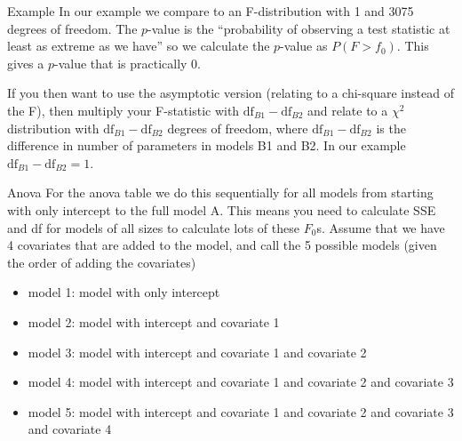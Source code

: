 \documentclass[
  ignorenonframetext,
]{beamer}
\providecommand{\tightlist}{%
  \setlength{\itemsep}{0pt}\setlength{\parskip}{0pt}}
\begin{document}
\begin{frame}{Example}
\label{example}
In our example we compare to an F-distribution with 1 and 3075 degrees
of freedom. The \(p\)-value is the ``probability of observing a test
statistic at least as extreme as we have'' so we calculate the
\(p\)-value as \(P(F>f_0)\). This gives a \(p\)-value that is
practically 0.

If you then want to use the asymptotic version (relating to a chi-square
instead of the F), then multiply your F-statistic with
\(\text{df}_{B1}-\text{df}_{B2}\) and relate to a \(\chi^2\)
distribution with \(\text{df}_{B1}-\text{df}_{B2}\) degrees of freedom,
where \(\text{df}_{B1}-\text{df}_{B2}\) is the difference in number of
parameters in models B1 and B2. In our example
\(\text{df}_{B1}-\text{df}_{B2}=1\).
\end{frame}

\begin{frame}{Anova}
\label{anova}
For the anova table we do this sequentially for all models from starting
with only intercept to the full model A. This means you need to
calculate SSE and df for models of all sizes to calculate lots of these
\(F_0\)s. Assume that we have 4 covariates that are added to the model,
and call the 5 possible models (given the order of adding the
covariates)

\begin{itemize}
\tightlist
\item
  model 1: model with only intercept
\item
  model 2: model with intercept and covariate 1
\item
  model 3: model with intercept and covariate 1 and covariate 2
\item
  model 4: model with intercept and covariate 1 and covariate 2 and
  covariate 3
\item
  model 5: model with intercept and covariate 1 and covariate 2 and
  covariate 3 and covariate 4
\end{itemize}
\end{frame}
\end{document}
